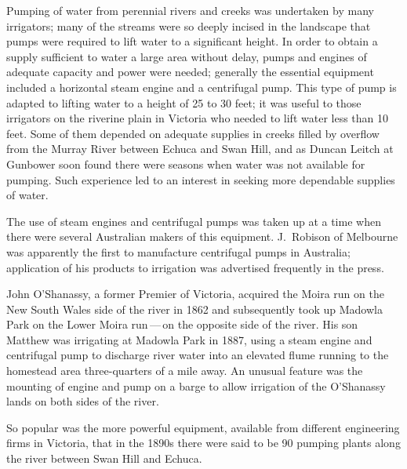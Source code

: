 Pumping of water from perennial rivers and creeks was undertaken by
many irrigators; many of the streams were so deeply incised in the
landscape that pumps were required to lift water to a significant
height.  In order to obtain a supply sufficient to water a large area
without delay, pumps and engines of adequate capacity and power were
needed; generally the essential equipment included a horizontal steam
engine and a centrifugal pump. 
 This type of pump is adapted to lifting water
to a height of 25 to 30 feet; it was useful to those irrigators on the
riverine plain in Victoria who needed to lift water less than 10 feet.
Some of them depended on adequate supplies in creeks filled by
overflow from the Murray River
 between
Echuca  and Swan Hill,  and as Duncan
Leitch  at Gunbower soon found there were seasons
when water was not available for pumping.  Such experience led to an
interest in seeking more dependable supplies of water.

The use of steam engines and centrifugal pumps was taken up at a time
when there were several Australian makers of this equipment.
J.~Robison  of Melbourne was apparently the first
to manufacture centrifugal pumps in Australia; application of his
products to irrigation was advertised frequently in the
press.

John O'Shanassy,  a former Premier of Victoria,
acquired the Moira run on the New South Wales side of the river in
1862 and subsequently took up Madowla Park \index{Madowla Park} on the
Lower \index{Moira} Moira run\,---\,on the opposite side of the river.
His son Matthew \index{O'Shanassay, M.} was irrigating at Madowla Park
in 1887, using a steam engine and centrifugal pump to discharge river
water into an elevated flume running to the homestead area
three-quarters of a mile away. An unusual feature was the mounting of
engine and pump on a barge to allow irrigation of the O'Shanassy lands
on both sides of the river.

So popular was the more powerful equipment, available from different
engineering firms in Victoria, that in the 1890s there were said to be
90 pumping plants along the river between Swan Hill and
Echuca.

